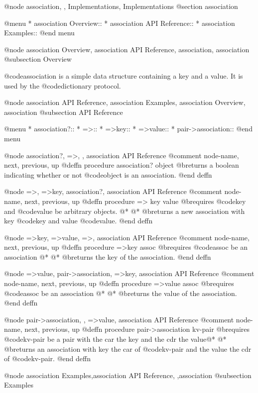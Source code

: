 @node association, , Implementations, Implementations
@section association

@menu
* association Overview::
* association API Reference::
* association Examples::
@end menu

@node association Overview, association API Reference, association, association
@subsection Overview

@code{association} is a simple data structure containing a key and a
value. It is used by the @code{dictionary} protocol. 

@node association API Reference, association Examples, association Overview, association
@subsection API Reference


@menu
* association?::
* =>::
* =>key::
* =>value::
* pair->association::
@end menu

@node association?, =>, , association API Reference
@comment node-name, next,          previous, up
@deffn {procedure} association? object
@b{returns} a boolean indicating whether or not 
@code{object} is an association.
@end deffn

@node =>, =>key, association?, association API Reference
@comment node-name, next,          previous, up
@deffn {procedure} => key value
@b{requires} @code{key} and @code{value} be arbitrary objects. @* @*
@b{returns} a new association with key @code{key} and value @code{value}.
@end deffn

@node =>key, =>value, =>, association API Reference
@comment node-name, next,          previous, up
@deffn {procedure} =>key assoc
@b{requires} @code{assoc} be an association @* @*
@b{returns} the key of the association.
@end deffn

@node =>value, pair->association, =>key, association API Reference
@comment node-name, next,          previous, up
@deffn {procedure} =>value assoc
@b{requires} @code{assoc} be an association @* @*
@b{returns} the value of the association.
@end deffn

@node pair->association, , =>value, association API Reference
@comment node-name, next,          previous, up
@deffn {procedure} pair->association kv-pair
@b{requires} @code{kv-pair} be a pair with the car the key and the cdr the
value@* @*
@b{returns} an association with key the car of @code{kv-pair} and the
value the cdr of @code{kv-pair}.
@end deffn

@node association Examples,association API Reference, ,association
@subsection Examples


